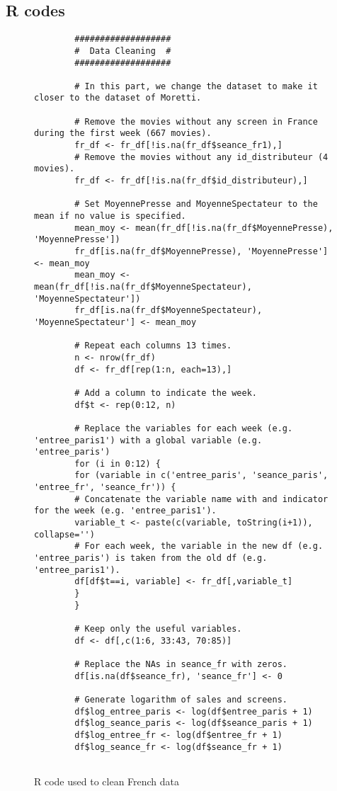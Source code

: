 \begin{appendices}
	\section{R codes}
	\begin{figure}[H]
		\caption{R code used to clean French data}
		\label{code_data_cleaning}
		\begin{lstlisting}
		###################
		#  Data Cleaning  #
		###################
		
		# In this part, we change the dataset to make it closer to the dataset of Moretti.
		
		# Remove the movies without any screen in France during the first week (667 movies).
		fr_df <- fr_df[!is.na(fr_df$seance_fr1),]
		# Remove the movies without any id_distributeur (4 movies).
		fr_df <- fr_df[!is.na(fr_df$id_distributeur),]
		
		# Set MoyennePresse and MoyenneSpectateur to the mean if no value is specified.
		mean_moy <- mean(fr_df[!is.na(fr_df$MoyennePresse), 'MoyennePresse'])
		fr_df[is.na(fr_df$MoyennePresse), 'MoyennePresse'] <- mean_moy
		mean_moy <- mean(fr_df[!is.na(fr_df$MoyenneSpectateur), 'MoyenneSpectateur'])
		fr_df[is.na(fr_df$MoyenneSpectateur), 'MoyenneSpectateur'] <- mean_moy
		
		# Repeat each columns 13 times.
		n <- nrow(fr_df)
		df <- fr_df[rep(1:n, each=13),]
		
		# Add a column to indicate the week.
		df$t <- rep(0:12, n)
		
		# Replace the variables for each week (e.g. 'entree_paris1') with a global variable (e.g. 'entree_paris')
		for (i in 0:12) {
		for (variable in c('entree_paris', 'seance_paris', 'entree_fr', 'seance_fr')) {
		# Concatenate the variable name with and indicator for the week (e.g. 'entree_paris1').
		variable_t <- paste(c(variable, toString(i+1)), collapse='')
		# For each week, the variable in the new df (e.g. 'entree_paris') is taken from the old df (e.g. 'entree_paris1').
		df[df$t==i, variable] <- fr_df[,variable_t]
		}
		}
		
		# Keep only the useful variables.
		df <- df[,c(1:6, 33:43, 70:85)]
		
		# Replace the NAs in seance_fr with zeros.
		df[is.na(df$seance_fr), 'seance_fr'] <- 0
		
		# Generate logarithm of sales and screens.
		df$log_entree_paris <- log(df$entree_paris + 1)
		df$log_seance_paris <- log(df$seance_paris + 1)
		df$log_entree_fr <- log(df$entree_fr + 1)
		df$log_seance_fr <- log(df$seance_fr + 1)
		

\end{lstlisting}
\end{figure}
\end{appendices}
